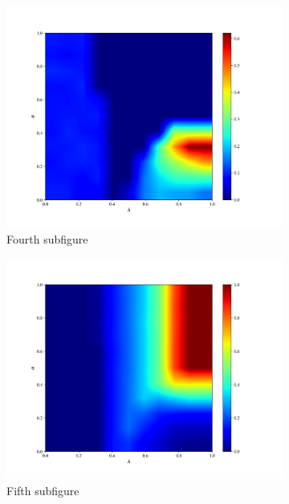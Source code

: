\documentclass{article}
\begin{document}
\begin{figure}[t!]
\begin{subfigure}{0.48\textwidth}
\includegraphics[width=\linewidth]{b015_1.png}
\caption{Fourth subfigure} \label{fig:d}
\end{subfigure}
\begin{subfigure}{0.48\textwidth}
\includegraphics[width=\linewidth]{b015_2.png}
\caption{Fifth subfigure} \label{fig:e}
\end{subfigure}\hspace*{\fill}
\begin{subfigure}{0.48\textwidth}

\end{subfigure}
\end{figure}
\end{document}
